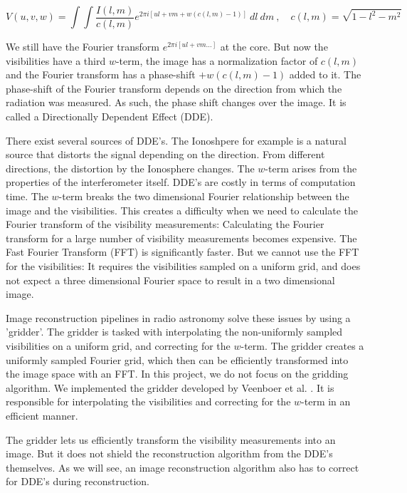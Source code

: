 \begin{equation}\label{intro2:model:widefov}
V(u, v, w) = \int\int  \frac{I(l, m)}{c(l, m)}  e^{2 \pi i [ul+vm + w(c(l, m) - 1)]} \: dl \: dm \:,  \quad c(l,m) = \sqrt{1 - l^2 - m ^2}
\end{equation} 

We still have the Fourier transform $ e^{2 \pi i [ul+vm \ldots]}$ at the core. But now the visibilities have a third $w$-term, the image has a normalization factor of $c(l, m)$ and the Fourier transform has a phase-shift $+ w(c(l, m) - 1)$ added to it. The phase-shift of the Fourier transform depends on the direction from which the radiation was measured. As such, the phase shift changes over the image. It is called a Directionally Dependent Effect (DDE).

There exist several sources of DDE's. The Ionoshpere for example is a natural source that distorts the signal depending on the direction. From different directions, the distortion by the Ionosphere changes. The $w$-term arises from the properties of the interferometer itself. DDE's are costly in terms of computation time. The $w$-term breaks the two dimensional Fourier relationship between the image and the visibilities. This creates a difficulty when we need to calculate the Fourier transform of the visibility measurements:  Calculating the Fourier transform for a large number of visibility measurements becomes expensive. The Fast Fourier Transform (FFT) is significantly faster. But we cannot use the FFT for the visibilities: It requires the visibilities sampled on a uniform grid, and does not expect a three dimensional Fourier space to result in a two dimensional image. 

Image reconstruction pipelines in radio astronomy solve these issues by using a 'gridder'. The gridder is tasked with interpolating the non-uniformly sampled visibilities on a uniform grid, and correcting for the $w$-term. The gridder creates a uniformly sampled Fourier grid, which then can be efficiently transformed into the image space with an FFT. In this project, we do not focus on the gridding algorithm. We implemented the gridder developed by Veenboer et al. \cite{veenboer2017image}. It is responsible for interpolating the visibilities and correcting for the $w$-term in an efficient manner.

The gridder lets us efficiently transform the visibility measurements into an image. But it does not shield the reconstruction algorithm from the DDE's themselves. As we will see, an image reconstruction algorithm also has to correct for DDE's during reconstruction. 


